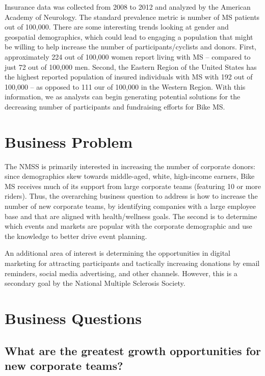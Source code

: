 \documentclass[]{article}
\begin{document}
Insurance data was collected from 2008 to 2012 and analyzed by the
American Academy of Neurology. The standard prevalence metric is number
of MS patients out of 100,000. There are some interesting trends looking
at gender and geospatial demographics, which could lead to engaging a
population that might be willing to help increase the number of
participants/cyclists and donors. First, approximately 224 out of
100,000 women report living with MS -- compared to just 72 out of
100,000 men. Second, the Eastern Region of the United States has the
highest reported population of insured individuals with MS with 192 out
of 100,000 -- as opposed to 111 our of 100,000 in the Western Region.
With this information, we as analysts can begin generating potential
solutions for the decreasing number of participants and fundraising
efforts for Bike MS.

\hypertarget{business-problem}{%
\section{Business Problem}\label{business-problem}}

The NMSS is primarily interested in increasing the number of corporate
donors: since demographics skew towards middle-aged, white, high-income
earners, Bike MS receives much of its support from large corporate teams
(featuring 10 or more riders). Thus, the overarching business question
to address is how to increase the number of new corporate teams, by
identifying companies with a large employee base and that are aligned
with health/wellness goals. The second is to determine which events and
markets are popular with the corporate demographic and use the knowledge
to better drive event planning.

An additional area of interest is determining the opportunities in
digital marketing for attracting participants and tactically increasing
donations by email reminders, social media advertising, and other
channels. However, this is a secondary goal by the National Multiple
Sclerosis Society.

\hypertarget{business-questions}{%
\section{Business Questions}\label{business-questions}}

\hypertarget{what-are-the-greatest-growth-opportunities-for-new-corporate-teams}{%
\subsection{What are the greatest growth opportunities for new corporate
teams?}\label{what-are-the-greatest-growth-opportunities-for-new-corporate-teams}}
\end{document}
